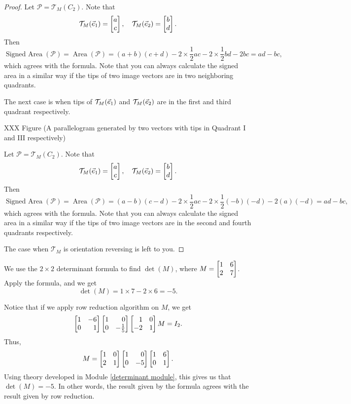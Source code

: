 \begin{proof}
Let $\mathcal{P}=\mathcal{T}_{M}(C_{2})$. Note that
\[
	\mathcal{T}_{M}({\vec e_1})= \begin{bmatrix}a \\ c\end{bmatrix},\quad \mathcal{T}_{M}({\vec e_2})=\begin{bmatrix}b \\ d\end{bmatrix}.
\]
Then
\[
	\operatorname{Signed~Area}(\mathcal{P})=\operatorname{Area}(\mathcal{P})=(a+b)(c+d)-2\times \frac{1}{2}ac-2\times \frac{1}{2}bd-2bc=ad-bc,
\]
which agrees with the formula. Note that you can always calculate the signed
area in a similar way if the tips of two image vectors are in two neighboring
quadrants.

The next case is when tips of $\mathcal{T}_{M}({\vec e_1})$ and
$\mathcal{T}_{M}({\vec e_2})$ are in the first and third quadrant respectively.

XXX Figure (A parallelogram generated by two vectors with tips in Quadrant I and
III respectively)

Let $\mathcal{P}=\mathcal{T}_{M}(C_{2})$. Note that
\[
	\mathcal{T}_{M}({\vec e_1})= \begin{bmatrix}a \\ c\end{bmatrix},\quad \mathcal{T}_{M}({\vec e_2})=\begin{bmatrix}b \\ d\end{bmatrix}.
\]
Then
\[
	\operatorname{Signed~Area}(\mathcal{P})=\operatorname{Area}(\mathcal{P})=(a-b)(c-d)-2\times \frac{1}{2}ac-2\times \frac{1}{2}(-b)(-d)-2(a)(-d)=ad-bc,
\]
which agrees with the formula. Note that you can always calculate the signed area
in a similar way if the tips of two image vectors are in the second and fourth quadrants
respectively.

The case when $\mathcal{T}_{M}$ is orientation reversing is left to you.\end{proof}
\begin{example}
	We use the $2\times 2$ determinant formula to find $\det(M)$, where
	$M=\mat{1 & 6 \\ 2 & 7}$. Apply the formula, and we get
	\[
		\det(M)=1\times 7-2\times 6=-5.
	\]
\end{example}
Notice that if we apply row reduction algorithm on $M$, we get
\[
	\mat{1 & -6 \\ 0 & 1}\mat{1 & 0 \\ 0 & -\frac{1}{5}}\mat{1 & 0 \\ -2 & 1}M=I_{2}.
\]
Thus,
\[
	M=\mat{1 & 0 \\ 2 & 1}\mat{1 & 0 \\ 0 & -5}\mat{1 & 6 \\ 0 & 1}.
\]
Using theory developed in Module \ref{determinant module}, this gives us that
$\det(M)=-5$. In other words, the result given by the formula agrees with the
result given by row reduction.

